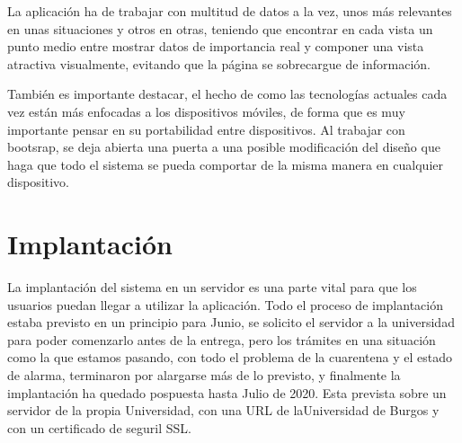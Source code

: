 La aplicación ha de trabajar con multitud de datos a la vez, unos más relevantes en unas situaciones y otros en otras, teniendo que encontrar en cada vista un punto medio entre mostrar datos de importancia real y componer una vista atractiva visualmente, evitando que la página se sobrecargue de información.

También es importante destacar, el hecho de como las tecnologías actuales cada vez están más enfocadas a los dispositivos móviles, de forma que es muy importante pensar en su portabilidad entre dispositivos. Al trabajar con bootsrap, se deja abierta una puerta a una posible modificación del diseño que haga que todo el sistema se pueda comportar de la misma manera en cualquier dispositivo.  

\section{Implantación}

La implantación del sistema en un servidor es una parte vital para que los usuarios puedan llegar a utilizar la aplicación. Todo el proceso de implantación estaba previsto en un principio para Junio, se solicito el servidor a la universidad para poder comenzarlo antes de la entrega, pero los trámites en una situación como la que estamos pasando, con todo el problema de la cuarentena y el estado de alarma, terminaron por alargarse más de lo previsto, y finalmente la implantación ha quedado pospuesta hasta Julio de 2020. 
Esta prevista sobre un servidor de la propia Universidad, con una URL de laUniversidad de Burgos y con un certificado de seguril SSL.